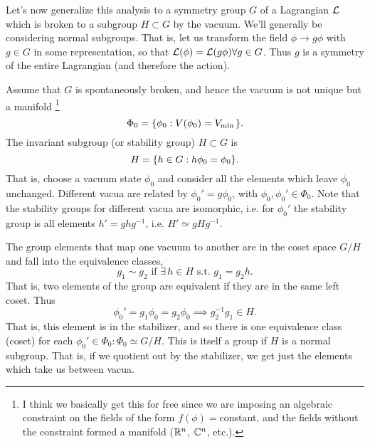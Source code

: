 Let's now generalize this analysis to a symmetry group $G$ of a Lagrangian $\mathcal L$ which is broken to a subgroup $H\subset G$ by the vacuum. We'll generally be considering normal subgroups. That is, let us transform the field $\phi\to g\phi$ with $g\in G$ in some representation, so that $\mathcal L(\phi)=\mathcal L(g\phi)\forall g\in G$. Thus $g$ is a symmetry of the entire Lagrangian (and therefore the action).

Assume that $G$ is spontaneously broken, and hence the vacuum is not unique but a manifold%
    \footnote{I think we basically get this for free since we are imposing an algebraic constraint on the fields of the form $f(\phi)={}$constant, and the fields without the constraint formed a manifold ($\mathbb{R}^n$, $\mathbb{C}^n$, etc.).}
\begin{equation}
    \Phi_0=\{\phi_0: V(\phi_0)=V_{\min{}}\}.
\end{equation}
The invariant subgroup (or stability group) $H\subset G$ is
\begin{equation}
    H=\{h\in G: h\phi_0 = \phi_0\}.
\end{equation}
That is, choose a vacuum state $\phi_0$ and consider all the elements which leave $\phi_0$ unchanged. Different vacua are related by $\phi_0'=g\phi_0$, with $\phi_0,\phi_0'\in \Phi_0$. Note that the stability groups for different vacua are isomorphic, i.e. for $\phi_0'$ the stability group is all elements $h'=ghg^{-1}$, i.e. $H'\simeq gH g^{-1}$.

The group elements that map one vacuum to another are in the coset space $G/H$ and fall into the equivalence classes,
\begin{equation}
    g_1 \sim g_2 \text{ if }\exists \,h\in H \text{ s.t. } g_1=g_2h.
\end{equation}
That is, two elements of the group are equivalent if they are in the same left coset. Thus
\begin{equation}
    \phi_0'=g_1 \phi_0 = g_2 \phi_0 \implies g_2^{-1} g_1\in H.
\end{equation}
That is, this element is in the stabilizer, and so there is one equivalence class (coset) for each $\phi_0'\in \Phi_0: \Phi_0 \simeq G/H$. This is itself a group if $H$ is a normal subgroup. That is, if we quotient out by the stabilizer, we get just the elements which take us between vacua.

